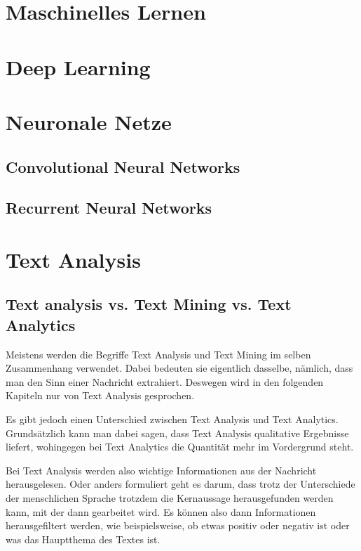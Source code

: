 \section{Maschinelles Lernen}


\section{Deep Learning}


\section{Neuronale Netze}
\subsection{Convolutional Neural Networks}

\subsection{Recurrent Neural Networks}


\section{Text Analysis}

\subsection{Text analysis vs. Text Mining vs. Text Analytics}

Meistens werden die Begriffe Text Analysis und Text Mining im selben Zusammenhang verwendet.
Dabei bedeuten sie eigentlich dasselbe, nämlich, dass man den Sinn einer Nachricht extrahiert.
Deswegen wird in den folgenden Kapiteln nur von Text Analysis gesprochen.

Es gibt jedoch einen Unterschied zwischen Text Analysis und Text Analytics.
Grundsätzlich kann man dabei sagen, dass Text Analysis qualitative Ergebnisse liefert, wohingegen bei Text Analytics die Quantität mehr im Vordergrund steht.\cite{textAnalysisMonkeylearn, machineLearningTextAnalysis}

Bei Text Analysis werden also wichtige Informationen aus der Nachricht herausgelesen.
Oder anders formuliert geht es darum, dass trotz der Unterschiede der menschlichen Sprache trotzdem die Kernaussage herausgefunden werden kann, mit der dann gearbeitet wird.
Es können also dann Informationen herausgefiltert werden, wie beispielsweise, ob etwas positiv oder negativ ist oder was das Hauptthema des Textes ist.\cite{textAnalysisMonkeylearn, machineLearningTextAnalysis}

